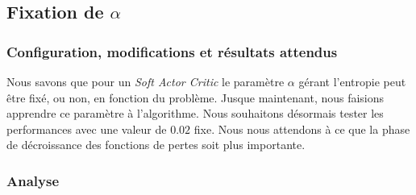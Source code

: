 \subsection{Fixation de \texorpdfstring{\(\alpha\)}{a}}

\subsubsection{Configuration, modifications et résultats attendus}

Nous savons que pour un \emph{Soft Actor Critic} le paramètre \(\alpha\) gérant
l'entropie peut être fixé, ou non, en fonction du problème. Jusque maintenant,
nous faisions apprendre ce paramètre à l'algorithme. Nous souhaitons désormais tester les performances avec une valeur de \(0.02\) fixe. Nous nous attendons à ce que la phase de décroissance des fonctions de pertes soit plus importante.

\subsubsection{Analyse}

